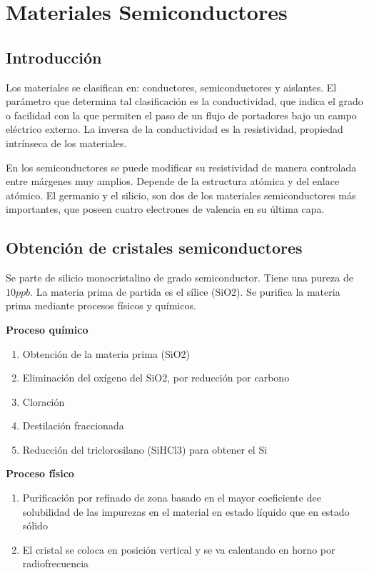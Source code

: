 \chapter{Materiales Semiconductores}

\section{Introducción}

Los materiales se clasifican en: conductores, semiconductores y aislantes. El parámetro que determina tal clasificación es la conductividad, que indica el grado o facilidad con la que permiten el paso de un flujo de portadores bajo un campo eléctrico externo. La inversa de la conductividad es la resistividad, propiedad intrínseca de los materiales.

En los semiconductores se puede modificar su resistividad de manera controlada entre márgenes muy amplios. Depende de la estructura atómica y del enlace atómico. El germanio y el silicio, son dos de los materiales semiconductores más importantes, que poseen cuatro electrones de valencia en su última capa.

\section{Obtención de cristales semiconductores}

Se parte de silicio monocristalino de grado semiconductor. Tiene una pureza de $10 ppb$. La materia prima de partida es el sílice (SiO2). Se purifica la materia prima mediante procesos físicos y químicos.

\textbf{Proceso químico}

\begin{enumerate}
    \item Obtención de la materia prima (SiO2)
    \item Eliminación del oxígeno del SiO2, por reducción por carbono
    \item Cloración
    \item Destilación fraccionada
    \item Reducción del triclorosilano (SiHCl3) para obtener el Si
\end{enumerate} 

\textbf{Proceso físico}
\begin{enumerate}
    \item Purificación por refinado de zona basado en el mayor coeficiente dee solubilidad de las impurezas en el material en estado líquido que en estado sólido
    \item El cristal se coloca en posición vertical y se va calentando en horno por radiofrecuencia
\end{enumerate}


